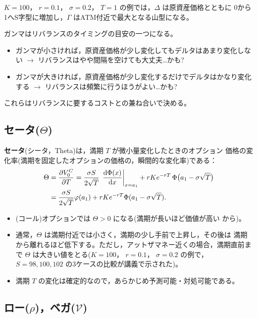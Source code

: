 $K=100$， $r=0.1$， $\sigma=0.2$， $T=1$ の例では，$\Delta$ は原資産価格とともに
0から1へS字型に増加し，$\Gamma$ はATM付近で最大となる山型になる。

\begin{keypoint}[ガンマとリバランス]
ガンマはリバランスのタイミングの目安の一つになる。
\begin{itemize}
\item ガンマが小さければ，原資産価格が少し変化してもデルタはあまり変化しない
$\to$ リバランスはやや間隔を空けても大丈夫…かも?
\item ガンマが大きければ，原資産価格が少し変化するだけでデルタはかなり変化する
$\to$ リバランスは頻繁に行うほうがよい…かも?
\end{itemize}
これらはリバランスに要するコストとの兼ね合いで決める。
\end{keypoint}

\subsection{セータ($\Theta$)}

\begin{definition}[セータ]
\textbf{セータ}(シータ，Theta)は，満期 $T$ が微小量変化したときのオプション
価格の変化率(満期を固定したオプションの価格の，瞬間的な変化率)である：
\begin{align}
\Theta &= \frac{\partial V_0^C}{\partial T}
= \frac{\sigma S}{2\sqrt{T}}\,\left.\frac{\mathrm{d}\Phi(x)}{\mathrm{d} x}\right|_{x=a_1}
+ rKe^{-rT}\,\Phi\bigl(a_1 - \sigma\sqrt{T}\bigr)\notag\\
&= \frac{\sigma S}{2\sqrt{T}}\varphi(a_1)
+ rKe^{-rT}\Phi(a_1-\sigma\sqrt{T}).
\end{align}
\end{definition}

\begin{itemize}
\item (コール)オプションでは $\Theta > 0$ になる(満期が長いほど価値が高い
から)。
\item 通常，$\Theta$ は満期付近では小さく，満期の少し手前で上昇し，その後は
満期から離れるほど低下する。ただし，アットザマネー近くの場合，満期直前まで
$\Theta$ は大きい値をとる($K=100$， $r=0.1$， $\sigma=0.2$ の例で，$S=98, 100,
102$ の3ケースの比較が講義で示された)。
\item 満期 $T$ の変化は確定的なので，あらかじめ予測可能・対処可能である。
\end{itemize}

\subsection{ロー($\rho$)，ベガ($\mathcal{V}$)}

